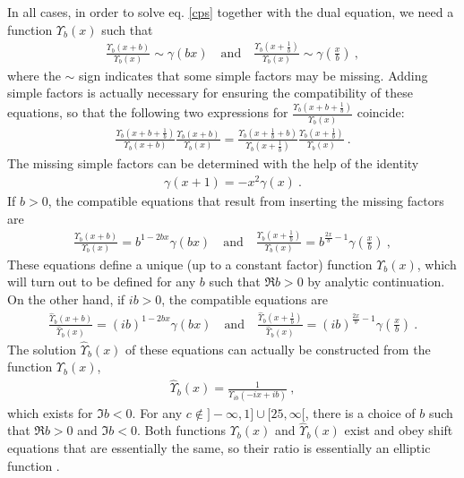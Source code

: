 \documentclass[12pt, a4paper, notitlepage, twoside]{report}
\numberwithin{equation}{section}
\theoremstyle{break}
\begin{document}
In all cases, in order to solve eq. \eqref{cps} together with the dual equation, we need a function $\Upsilon_b(x)$ such that 
\begin{align}
 \frac{\Upsilon_b(x+b)}{\Upsilon_b(x)} \sim \gamma(bx)\quad \text{and} \quad \frac{\Upsilon_b(x+\frac{1}{b})}{\Upsilon_b(x)} \sim \gamma(\tfrac{x}{b})\ ,
\end{align}
where the $\sim$ sign indicates that some simple factors may be missing.
Adding simple factors is actually necessary for ensuring the compatibility of these equations, so that the following two expressions for $ \frac{\Upsilon_b(x+b+\frac{1}{b})}{\Upsilon_b(x)}$ coincide:
\begin{align}
  \frac{\Upsilon_b(x+b+\frac{1}{b})}{\Upsilon_b(x+b)} \frac{\Upsilon_b(x+b)}{\Upsilon_b(x)} = \frac{\Upsilon_b(x+\frac{1}{b}+b)}{\Upsilon_b(x+\frac{1}{b})} \frac{\Upsilon_b(x+\frac{1}{b})}{\Upsilon_b(x)} \ .
\end{align}
The missing simple factors can be determined with the help of the identity
\begin{align}
 \gamma(x+1) = -x^2 \gamma(x) \ .
\end{align}
If $b>0$, the compatible equations that result from inserting the missing factors are 
\begin{align}
  \boxed{\frac{\Upsilon_b(x+b)}{\Upsilon_b(x)} = b^{1-2bx} \gamma(bx)}\quad \text{and} \quad \boxed{\frac{\Upsilon_b(x+\frac{1}{b})}{\Upsilon_b(x)} = b^{\frac{2x}{b}-1} \gamma(\tfrac{x}{b})}\ ,
\label{upup}
\end{align}
These equations define a unique (up to a constant factor) function $\Upsilon_b(x)$, which will turn out to be defined for any $b$ such that $\Re b > 0$ by analytic continuation. 
On the other hand, if $ib>0$, the compatible equations are 
\begin{align}
 \frac{\hat{\Upsilon}_b(x+b)}{\hat{\Upsilon}_b(x)} = (ib)^{1-2bx} \gamma(bx)\quad \text{and} \quad \frac{\hat{\Upsilon}_b(x+\frac{1}{b})}{\hat{\Upsilon}_b(x)} = (ib)^{\frac{2x}{b}-1} \gamma(\tfrac{x}{b})\ .
\end{align}
The solution $\hat\Upsilon_b(x)$ of these equations can actually be constructed from the function $\Upsilon_b(x)$,
\begin{align}
 \boxed{ \hat{\Upsilon}_b(x) = \frac{1}{\Upsilon_{ib}(-ix+ib)} }\ ,
\label{tub}
\end{align}
which exists for $\Im b < 0$. 
For any $c\notin ]-\infty, 1] \cup [25,\infty[$, there is a choice of $b$ such that $\Re b>0$ and $\Im b<0$. 
Both functions $\Upsilon_b(x)$ and $\hat\Upsilon_b(x)$ exist and obey shift equations that are essentially the same, so their ratio is essentially an elliptic function \cite{zam05}. 
\end{document}

